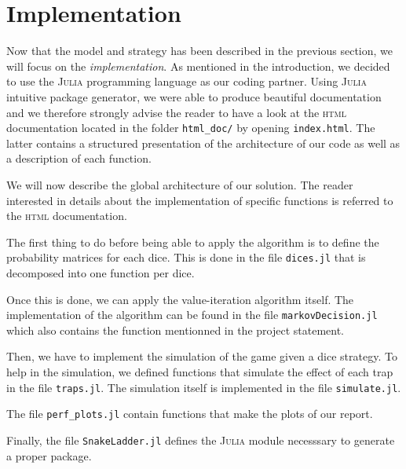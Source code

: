 \section{Implementation} %
\label{sec:implementation}
Now that the model and strategy has been described in the previous
section, we will focus on the \emph{implementation}.
As mentioned in the introduction, we decided to use the \textsc{Julia}
programming language as our coding partner.
Using \textsc{Julia} intuitive package generator, we were able to
produce beautiful documentation and we therefore strongly advise
the reader to have a look at the \textsc{html} documentation located
in the folder \lstinline|html_doc/| by opening \texttt{index.html}.
The latter contains a structured presentation of the architecture
of our code as well as a description of each function.

We will now describe the global architecture of our solution. 
The reader interested in details about the implementation of
specific functions is referred to the \textsc{html} documentation. 

The first thing to do before being able to apply the algorithm
is to define the probability matrices for each dice. 
This is done in the file \texttt{dices.jl} that is decomposed into
one function per dice. 

Once this is done, we can apply the value-iteration algorithm itself. 
The implementation of the algorithm can be found in the file \texttt{markovDecision.jl}
which also contains the function mentionned in the project statement. 

Then, we have to implement the simulation of the game given a dice strategy.
To help in the simulation, we defined functions that simulate the effect
of each trap in the file \texttt{traps.jl}. The simulation itself is
implemented in the file \texttt{simulate.jl}. 

The file \texttt{perf\_plots.jl} contain functions that make the plots
of our report. 

Finally, the file \texttt{SnakeLadder.jl} defines the \textsc{Julia} module
necesssary to generate a proper package. 


